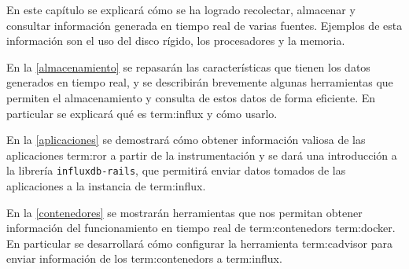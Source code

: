 En este capítulo se explicará cómo se ha logrado recolectar, almacenar y
consultar información generada en tiempo real de varias fuentes. Ejemplos de
esta información son el uso del disco rígido, los procesadores y la memoria.

En la \autoref{almacenamiento} se repasarán las características que tienen los
datos generados en tiempo real, y se describirán brevemente algunas herramientas
que permiten el almacenamiento y consulta de estos datos de forma eficiente. En
particular se explicará qué es \gls{term:influx} y cómo usarlo.

En la \autoref{aplicaciones} se demostrará cómo obtener información valiosa de
las aplicaciones \gls{term:ror} a partir de la instrumentación y se dará una
introducción a la librería \texttt{influxdb-rails}, que permitirá enviar datos
tomados de las aplicaciones a la instancia de \gls{term:influx}.

En la \autoref{contenedores} se mostrarán herramientas que nos permitan obtener
información del funcionamiento en tiempo real de \glspl{term:contenedor}
\gls{term:docker}. En particular se desarrollará cómo configurar la herramienta
\gls{term:cadvisor} para enviar información de los \glspl{term:contenedor} a
\gls{term:influx}.
